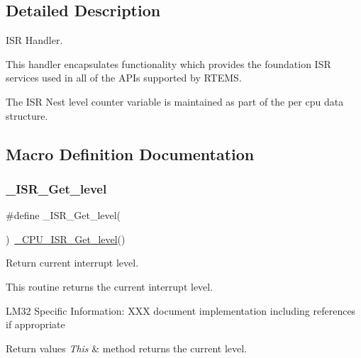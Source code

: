 \subsection{Detailed Description}
I\+SR Handler. 

This handler encapsulates functionality which provides the foundation I\+SR services used in all of the A\+P\+Is supported by R\+T\+E\+MS.

The I\+SR Nest level counter variable is maintained as part of the per cpu data structure. 

\subsection{Macro Definition Documentation}
\mbox{\label{group__RTEMSScoreISR_gab54704104a6c83ee1e649af116d0419e}} 
\subsubsection{\texorpdfstring{\_ISR\_Get\_level}{\_ISR\_Get\_level}}
{\footnotesize\ttfamily \#define \+\_\+\+I\+S\+R\+\_\+\+Get\+\_\+level(\begin{DoxyParamCaption}{ }\end{DoxyParamCaption})~\mbox{\hyperlink{group__RTEMSScoreCPUARM_ga1d9dcab9170d532b6634a5620385adbd}{\+\_\+\+C\+P\+U\+\_\+\+I\+S\+R\+\_\+\+Get\+\_\+level}}()}



Return current interrupt level. 

This routine returns the current interrupt level.

L\+M32 Specific Information\+: X\+XX document implementation including references if appropriate


\begin{DoxyRetVals}{Return values}
{\em This} & method returns the current level. \\
\hline
\end{DoxyRetVals}
\mbox{\label{group__RTEMSScoreISR_gae4dc7eaa448c116a2ada205e276465c1}} 
